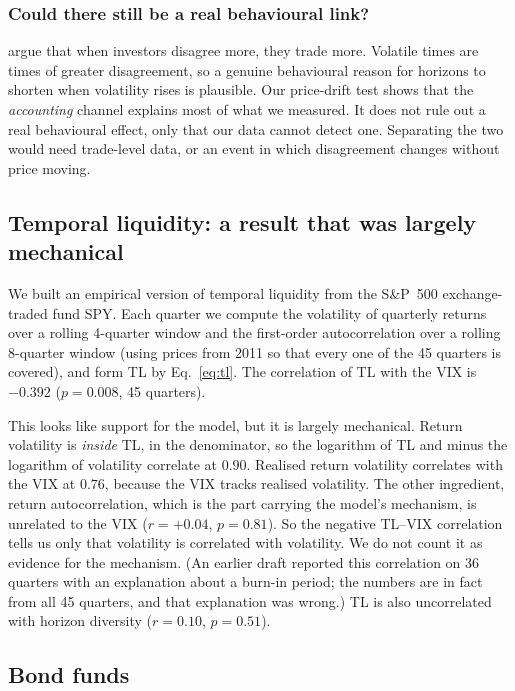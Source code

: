 \subsubsection{Could there still be a real behavioural link?}

\citet{harrisraviv1993} argue that when investors disagree more, they trade more. Volatile times are times of greater disagreement, so a genuine behavioural reason for horizons to shorten when volatility rises is plausible. Our price-drift test shows that the \emph{accounting} channel explains most of what we measured. It does not rule out a real behavioural effect, only that our data cannot detect one. Separating the two would need trade-level data, or an event in which disagreement changes without price moving.

\subsection{Temporal liquidity: a result that was largely mechanical}
\label{sec:tl}

We built an empirical version of temporal liquidity from the S\&P~500 exchange-traded fund SPY. Each quarter we compute the volatility of quarterly returns over a rolling 4-quarter window and the first-order autocorrelation over a rolling 8-quarter window (using prices from 2011 so that every one of the 45 quarters is covered), and form TL by Eq.~\eqref{eq:tl}. The correlation of TL with the VIX is $-0.392$ ($p=0.008$, 45 quarters).

This looks like support for the model, but it is largely mechanical. Return volatility is \emph{inside} TL, in the denominator, so the logarithm of TL and minus the logarithm of volatility correlate at $0.90$. Realised return volatility correlates with the VIX at $0.76$, because the VIX tracks realised volatility. The other ingredient, return autocorrelation, which is the part carrying the model's mechanism, is unrelated to the VIX ($r=+0.04$, $p=0.81$). So the negative TL--VIX correlation tells us only that volatility is correlated with volatility. We do not count it as evidence for the mechanism. (An earlier draft reported this correlation on 36 quarters with an explanation about a burn-in period; the numbers are in fact from all 45 quarters, and that explanation was wrong.) TL is also uncorrelated with horizon diversity ($r=0.10$, $p=0.51$).

\subsection{Bond funds}
\label{sec:bonds}

